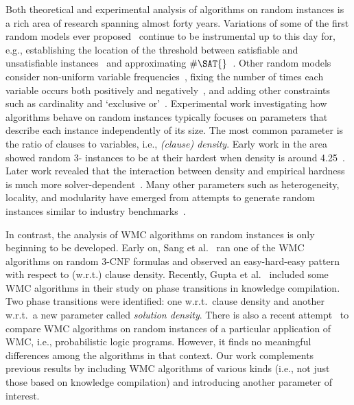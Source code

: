 \documentclass[runningheads]{llncs}
\begin{document}
Both theoretical and experimental analysis of \SAT{} algorithms on random
instances is a rich area of research spanning almost forty years. Variations of
some of the first random models ever
proposed~\cite{DBLP:journals/dam/FrancoP83,DBLP:journals/siamcomp/PurdomB83}
continue to be instrumental up to this day for, e.g., establishing the location
of the threshold between satisfiable and unsatisfiable
instances~\cite{DBLP:conf/focs/AchlioptasM02} and approximating
$\#\SAT{}$~\cite{DBLP:journals/siamcomp/GalanisGGY21}. Other random models
consider non-uniform variable frequencies~\cite{DBLP:conf/ijcai/AnsoteguiBL09},
fixing the number of times each variable occurs both positively and
negatively~\cite{DBLP:journals/cpc/Coja-OghlanW18}, and adding other constraints
such as cardinality and `exclusive or'~\cite{DBLP:conf/ijcai/PoteJM19}.
Experimental work investigating how \SAT{} algorithms behave on random instances
typically focuses on parameters that describe each instance independently
of its size. The most common parameter is the ratio of clauses to variables,
i.e., \emph{(clause) density}. Early work in the area showed random 3-\SAT{}
instances to be at their hardest when density is around
4.25~\cite{DBLP:conf/aaai/MitchellSL92}. Later work revealed that the
interaction between density and empirical hardness is much more
solver-dependent~\cite{DBLP:journals/constraints/CoarfaDASV03}. Many other
parameters such as heterogeneity, locality, and modularity have emerged from
attempts to generate random instances similar to industry
benchmarks~\cite{DBLP:conf/ijcai/AnsoteguiBL09,DBLP:conf/tacas/BlasiusFS19,DBLP:journals/ai/Giraldez-CruL16,DBLP:conf/ijcai/Giraldez-CruL17}.

In contrast, the analysis of \textsf{WMC} algorithms on random instances is only
beginning to be developed. Early on, Sang et
al.~\cite{DBLP:conf/sat/SangBBKP04,DBLP:conf/sat/SangBK05} ran one of the
\textsf{WMC} algorithms on random 3-CNF formulas and observed an easy-hard-easy
pattern with respect to (w.r.t.) clause density. Recently, Gupta et
al.~\cite{DBLP:conf/cp/GuptaRM20} included some \textsf{WMC} algorithms in their
study on phase transitions in knowledge compilation. Two phase transitions were
identified: one w.r.t.\ clause density and another w.r.t.\ a new parameter called
\emph{solution density}. There is also a recent
attempt~\cite{DBLP:conf/cp/DilkasB20} to compare \textsf{WMC} algorithms on
random instances of a particular application of \textsf{WMC}, i.e.,
probabilistic logic programs. However, it finds no meaningful differences among
the algorithms in that context. Our work complements previous results by
including \textsf{WMC} algorithms of various kinds (i.e., not just those based
on knowledge compilation) and introducing another parameter of interest.
\end{document}

